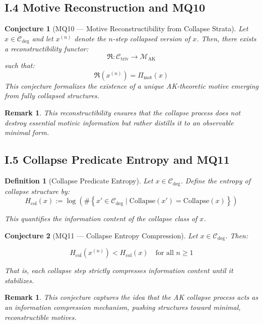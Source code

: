 \documentclass[11pt]{article}
\newtheorem{definition}[theorem]{Definition}
\newtheorem{remark}[theorem]{Remark}
\newtheorem{conjecture}{Conjecture}[section]
\begin{document}
\subsection*{I.4 Motive Reconstruction and MQ10}

\begin{conjecture}[MQ10 — Motive Reconstructibility from Collapse Strata]
Let $x \in \mathcal{C}_{\mathrm{deg}}$ and let $x^{(n)}$ denote the $n$-step collapsed version of $x$. Then, there exists a reconstructibility functor:
\[
\mathfrak{R} : \mathcal{C}_{\mathrm{triv}} \to \mathcal{M}_{\mathrm{AK}}
\]
such that:
\[
\mathfrak{R}(x^{(n)}) = \Pi_{\mathrm{mot}}(x)
\]
This conjecture formalizes the existence of a unique AK-theoretic motive emerging from fully collapsed structures.
\end{conjecture}

\begin{remark}
This reconstructibility ensures that the collapse process does not destroy essential motivic information but rather distills it to an observable minimal form.
\end{remark}

\subsection*{I.5 Collapse Predicate Entropy and MQ11}

\begin{definition}[Collapse Predicate Entropy]
Let $x \in \mathcal{C}_{\mathrm{deg}}$. Define the entropy of collapse structure by:
\[
H_{\mathrm{col}}(x) := \log \left( \# \left\{ x' \in \mathcal{C}_{\mathrm{deg}} \mid \mathrm{Collapse}(x') = \mathrm{Collapse}(x) \right\} \right)
\]

This quantifies the information content of the collapse class of $x$.
\end{definition}

\begin{conjecture}[MQ11 — Collapse Entropy Compression]
Let $x \in \mathcal{C}_{\mathrm{deg}}$. Then:

\[
H_{\mathrm{col}}(x^{(n)}) < H_{\mathrm{col}}(x) \quad \text{for all } n \geq 1
\]

That is, each collapse step strictly compresses information content until it stabilizes.
\end{conjecture}

\begin{remark}
This conjecture captures the idea that the AK collapse process acts as an information compression mechanism, pushing structures toward minimal, reconstructible motives.
\end{remark}
\end{document}
